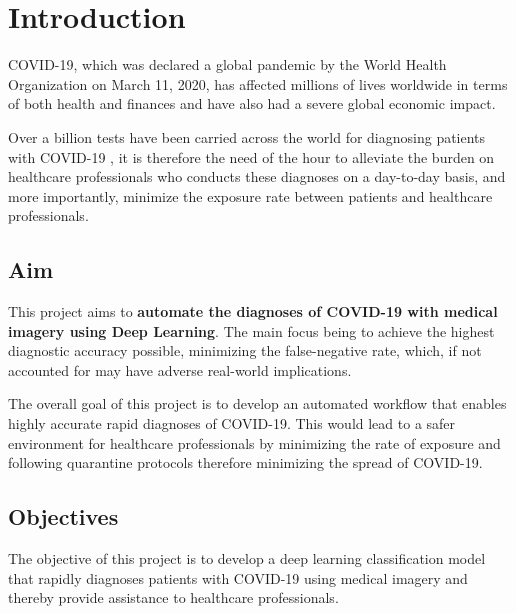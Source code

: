 
\chapter{Introduction} %

\label{ChapterX} %


COVID-19, which was declared a global pandemic by the World Health Organization on March 11, 2020, has affected
millions of lives worldwide in terms of both health and finances and have also had 
a severe global economic impact.

Over a billion tests have been carried across the world for diagnosing patients with COVID-19 \cite{STA21}, 
it is therefore the need of the hour to alleviate the burden on healthcare professionals who conducts these diagnoses on a day-to-day basis, 
and more importantly, minimize the exposure rate between patients and healthcare professionals.
\section{Aim}

This project aims to \textbf{automate the diagnoses of COVID-19 with medical imagery using Deep Learning}. The main focus being
to achieve the highest diagnostic accuracy possible, minimizing the false-negative rate, which, if not accounted for may have adverse real-world implications. 

The overall goal of this project is to develop an automated workflow that enables highly accurate rapid 
diagnoses of COVID-19. This would lead to a safer environment 
for healthcare professionals by minimizing the rate of exposure and following quarantine protocols 
therefore minimizing the spread of COVID-19.

\section{Objectives}

The objective of this project is to develop a deep learning classification model 
that rapidly diagnoses patients with COVID-19 using medical imagery and thereby provide assistance to healthcare professionals.

